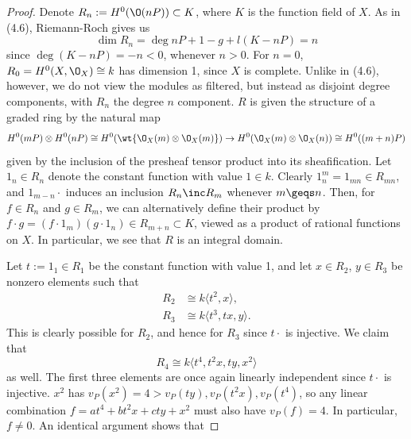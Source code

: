\documentclass[12pt]{amsart}
\begin{document}
\begin{proof}
  Denote $R_n:= H^0(\O(nP))\subset K$, where $K$ is the function field of $X$.
  As in (4.6), Riemann-Roch gives us
  \[
    \dim R_n = \deg nP + 1 - g + l(K-nP) = n
  \] 
  since $\deg (K-nP)=-n<0$, whenever $n>0$.
  For $n=0$, $R_0=H^0(X,\O_X)\cong k$ has dimension 1, since $X$ is complete.
  Unlike in (4.6), however, we do not view the modules as filtered, but instead as disjoint degree components, with $R_n$ the degree $n$ component.
  $R$ is given the structure of a graded ring by the natural map
  \[
    H^0(mP)\otimes H^0(nP)\cong H^0(\wt{\O_X(m)\otimes\O_X(m)})\to H^0(\O_X(m)\otimes\O_X(n))\cong H^0((m+n)P)
  \] 
  given by the inclusion of the presheaf tensor product into its sheafification.
  Let $1_n\in R_n$ denote the constant function with value $1\in k$. 
  Clearly $1_n^m = 1_{mn}\in R_{mn}$, and $1_{m-n}\cdot$ induces an inclusion $R_n\inc R_m$ whenever $m\geqs n$.
  Then, for $f\in R_n$ and $g\in R_m$, we can alternatively define their product by $f\cdot g= (f\cdot 1_m)(g\cdot 1_n)\in R_{m+n}\subset K$, viewed as a product of rational functions on $X$.
  In particular, we see that $R$ is an integral domain.

  Let $t:=1_1\in R_1$ be the constant function with value 1, and let $x\in R_2$, $y\in R_3$ be nonzero elements such that
  \begin{align*}
    R_2 &\cong k\langle t^2,x\rangle, \\
    R_3 &\cong k\langle t^3, tx, y\rangle.
  \end{align*}
  This is clearly possible for $R_2$, and hence for $R_3$ since $t\cdot$ is injective.
  We claim that
  \[
    R_4 \cong k\langle t^4, t^2x, ty, x^2\rangle
  \] 
  as well.
  The first three elements are once again linearly independent since $t\cdot$ is injective.
  $x^2$ has $v_P(x^2)=4>v_P(ty),v_P(t^2x),v_P(t^4)$, so any linear combination $f=at^4+bt^2x+cty+x^2$ must also have $v_P(f)=4$. 
  In particular, $f\neq 0$.
  An identical argument shows that


\end{proof}
\end{document}
